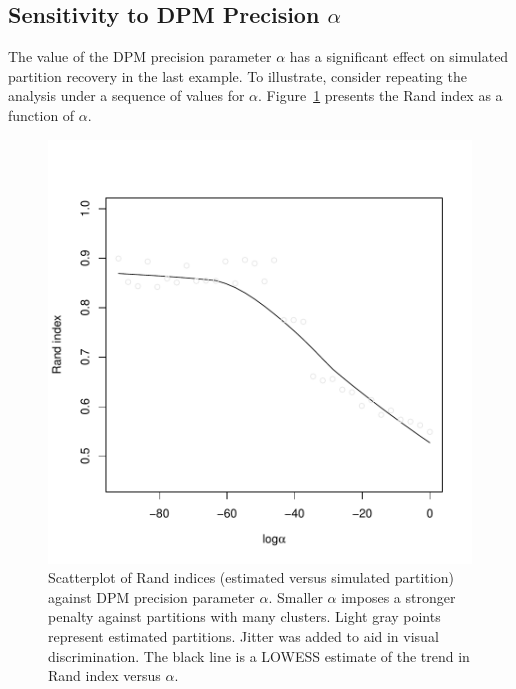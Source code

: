 \documentclass[article, nojss]{jss}
\begin{document}
\subsection[Sensitivity]{Sensitivity to DPM Precision $\alpha$}

The value of the DPM precision parameter $\alpha$ has a significant effect on simulated partition recovery in the last example. To illustrate, consider repeating the analysis under a sequence of values for $\alpha$. Figure~\ref{fig:sim3} presents the Rand index as a function of $\alpha$.


\begin{Schunk}
\end{Schunk}

\begin{figure}[h!]
\begin{center}
\includegraphics{profdpm-010}
\end{center}
\caption{Scatterplot of Rand indices (estimated versus simulated partition) against DPM precision parameter $\alpha$. Smaller $\alpha$ imposes a stronger penalty against partitions with many clusters. Light gray points represent estimated partitions. Jitter was added to aid in visual discrimination. The black line is a LOWESS estimate of the trend in Rand index versus $\alpha$. \label{fig:sim3}}
\end{figure}
\end{document}

